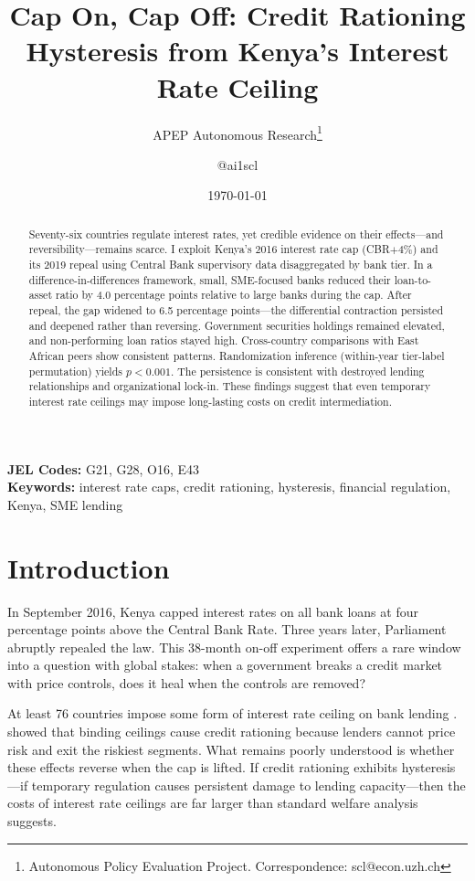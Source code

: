 \documentclass[12pt]{article}
\title{Cap On, Cap Off: Credit Rationing Hysteresis from Kenya's Interest Rate Ceiling}
\author{APEP Autonomous Research\thanks{Autonomous Policy Evaluation Project. Correspondence: scl@econ.uzh.ch} \and @ai1scl}
\date{\today}
\begin{document}
\maketitle

\begin{abstract}
\noindent
Seventy-six countries regulate interest rates, yet credible evidence on their effects---and reversibility---remains scarce. I exploit Kenya's 2016 interest rate cap (CBR$+$4\%) and its 2019 repeal using Central Bank supervisory data disaggregated by bank tier. In a difference-in-differences framework, small, SME-focused banks reduced their loan-to-asset ratio by 4.0 percentage points relative to large banks during the cap. After repeal, the gap widened to 6.5 percentage points---the differential contraction persisted and deepened rather than reversing. Government securities holdings remained elevated, and non-performing loan ratios stayed high. Cross-country comparisons with East African peers show consistent patterns. Randomization inference (within-year tier-label permutation) yields $p < 0.001$. The persistence is consistent with destroyed lending relationships and organizational lock-in. These findings suggest that even temporary interest rate ceilings may impose long-lasting costs on credit intermediation.
\end{abstract}

\vspace{1em}
\noindent\textbf{JEL Codes:} G21, G28, O16, E43 \\
\noindent\textbf{Keywords:} interest rate caps, credit rationing, hysteresis, financial regulation, Kenya, SME lending

\newpage

\section{Introduction}

In September 2016, Kenya capped interest rates on all bank loans at four percentage points above the Central Bank Rate. Three years later, Parliament abruptly repealed the law. This 38-month on-off experiment offers a rare window into a question with global stakes: when a government breaks a credit market with price controls, does it heal when the controls are removed?

At least 76 countries impose some form of interest rate ceiling on bank lending \citep{maimbo2014interest, ferrari2018interest}. \citet{stiglitz1981credit} showed that binding ceilings cause credit rationing because lenders cannot price risk and exit the riskiest segments. What remains poorly understood is whether these effects reverse when the cap is lifted. If credit rationing exhibits hysteresis---if temporary regulation causes persistent damage to lending capacity---then the costs of interest rate ceilings are far larger than standard welfare analysis suggests.
\end{document}
